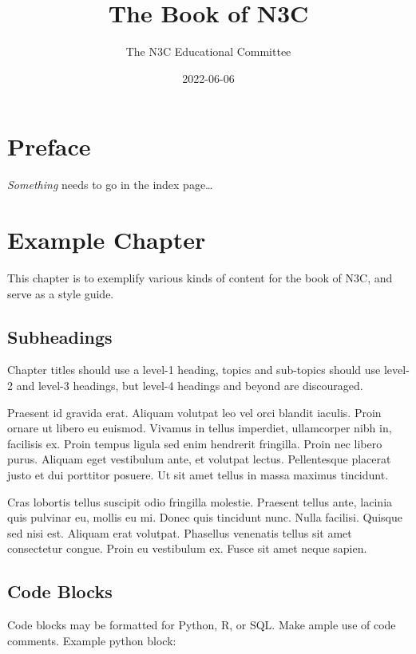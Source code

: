 \documentclass[
]{book}
\title{The Book of N3C}
\author{The N3C Educational Committee}
\date{2022-06-06}
\begin{document}
\maketitle

{
\setcounter{tocdepth}{1}
\tableofcontents
}
\hypertarget{preface}{%
\chapter{Preface}\label{preface}}

\emph{Something} needs to go in the index page\ldots{}

\hypertarget{example-chapter}{%
\chapter{Example Chapter}\label{example-chapter}}

This chapter is to exemplify various kinds of content for the book of N3C, and serve as a style guide.

\hypertarget{subheadings}{%
\section{Subheadings}\label{subheadings}}

Chapter titles should use a level-1 heading, topics and sub-topics should use level-2 and level-3 headings, but level-4 headings and beyond are discouraged.

Praesent id gravida erat. Aliquam volutpat leo vel orci blandit iaculis. Proin ornare ut libero eu euismod. Vivamus in tellus imperdiet, ullamcorper nibh in, facilisis ex. Proin tempus ligula sed enim hendrerit fringilla. Proin nec libero purus. Aliquam eget vestibulum ante, et volutpat lectus. Pellentesque placerat justo et dui porttitor posuere. Ut sit amet tellus in massa maximus tincidunt.

Cras lobortis tellus suscipit odio fringilla molestie. Praesent tellus ante, lacinia quis pulvinar eu, mollis eu mi. Donec quis tincidunt nunc. Nulla facilisi. Quisque sed nisi est. Aliquam erat volutpat. Phasellus venenatis tellus sit amet consectetur congue. Proin eu vestibulum ex. Fusce sit amet neque sapien.

\hypertarget{code-blocks}{%
\section{Code Blocks}\label{code-blocks}}

Code blocks may be formatted for Python, R, or SQL. Make ample use of code comments. Example python block:
\end{document}
